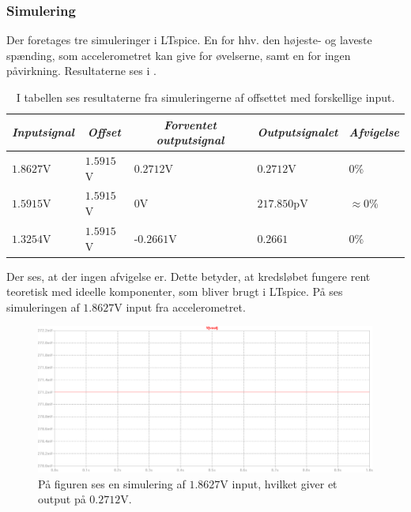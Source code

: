 \subsubsection{Simulering}
Der foretages tre simuleringer i LTspice. En for hhv. den højeste- og laveste spænding, som accelerometret kan give for øvelserne, samt en for ingen påvirkning. Resultaterne ses i .
\begin{table}[H]
	\centering
	\begin{tabular}{|l|l|l|l|l|}
		\hline
		\multicolumn{1}{|c|}{\textit{Inputsignal}} & \multicolumn{1}{c|}{\textit{Offset}} & \multicolumn{1}{c|}{\textit{Forventet outputsignal}} & \multicolumn{1}{c|}{\textit{Outputsignalet}} & \multicolumn{1}{c|}{\textit{Afvigelse}} \\ \hline
		$1.8627$V     & $1.5915$V    & $0.2712$V     & $0.2712$V     & $0$\%              \\ \hline
		$1.5915$V     & $1.5915$V    & $0$V          & $217.850$pV   & $\approx 0$\%      \\ \hline
		$1.3254$V     & $1.5915$V    & -$0.2661$V    & $0.2661$      & $0$\%                \\ \hline
	\end{tabular}
	\caption{I tabellen ses resultaterne fra simuleringerne af offsettet med forskellige input.}
	\label{Tab:offset_sim}
\end{table}
Der ses, at der ingen afvigelse er. Dette betyder, at kredsløbet fungere rent teoretisk med ideelle komponenter, som bliver brugt i LTspice. På  ses simuleringen af $1.8627$V input fra accelerometret.
 
\begin{figure}[H]
\centering
\includegraphics[scale=0.35]{figures/cProblemloesning/Offset_simulering.png}
\caption{På figuren ses en simulering af $1.8627$V input, hvilket giver et output på $0.2712$V.}
\label{fig:Offset_simulering}
\end{figure}

